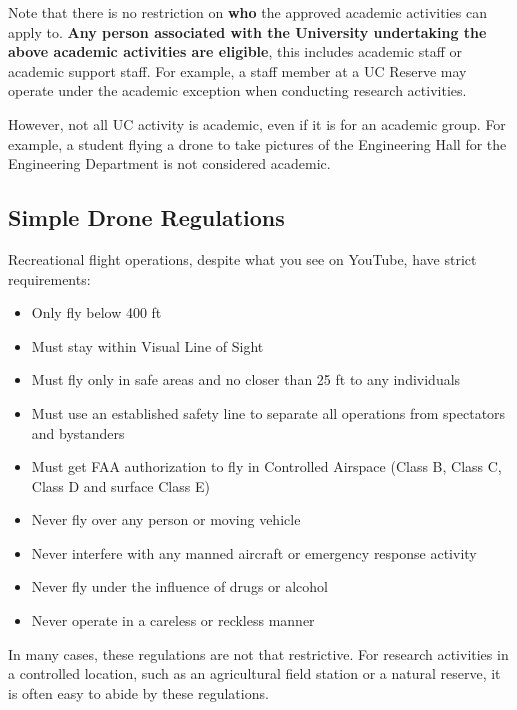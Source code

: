 \documentclass[
  12pt,
]{book}
\providecommand{\tightlist}{%
  \setlength{\itemsep}{0pt}\setlength{\parskip}{0pt}}
\newenvironment{notebox}{
  \definecolor{shadecolor}{gray}{.8}  %
  \color{black}
  \begin{shaded}}
 {\end{shaded}}
\begin{document}
Note that there is no restriction on \textbf{who} the approved academic activities can apply to. \textbf{Any person associated with the University undertaking the above academic activities are eligible}, this includes academic staff or academic support staff. For example, a staff member at a UC Reserve may operate under the academic exception when conducting research activities.

\begin{notebox}
However, not all UC activity is academic, even if it is for an academic group. For example, a student flying a drone to take pictures of the Engineering Hall for the Engineering Department is not considered academic.

\end{notebox}

\subsection{Simple Drone Regulations}\label{simple-drone-regulations}

Recreational flight operations, despite what you see on YouTube, have strict requirements:

\begin{itemize}
\tightlist
\item
  Only fly below 400 ft
\item
  Must stay within Visual Line of Sight
\item
  Must fly only in safe areas and no closer than 25 ft to any individuals
\item
  Must use an established safety line to separate all operations from spectators and bystanders
\item
  Must get FAA authorization to fly in Controlled Airspace (Class B, Class C, Class D and surface Class E)
\item
  Never fly over any person or moving vehicle
\item
  Never interfere with any manned aircraft or emergency response activity
\item
  Never fly under the influence of drugs or alcohol
\item
  Never operate in a careless or reckless manner
\end{itemize}

In many cases, these regulations are not that restrictive. For research activities in a controlled location, such as an agricultural field station or a natural reserve, it is often easy to abide by these regulations.
\end{document}
